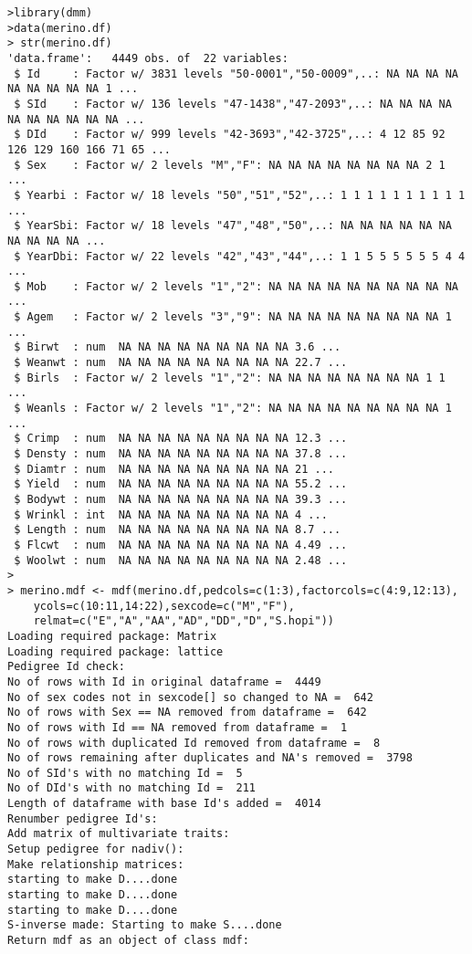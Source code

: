 \documentclass[titlepage]{article}  %
\begin{document}
\begin{verbatim}
>library(dmm)
>data(merino.df)
> str(merino.df)
'data.frame':	4449 obs. of  22 variables:
 $ Id     : Factor w/ 3831 levels "50-0001","50-0009",..: NA NA NA NA NA NA NA NA NA 1 ...
 $ SId    : Factor w/ 136 levels "47-1438","47-2093",..: NA NA NA NA NA NA NA NA NA NA ...
 $ DId    : Factor w/ 999 levels "42-3693","42-3725",..: 4 12 85 92 126 129 160 166 71 65 ...
 $ Sex    : Factor w/ 2 levels "M","F": NA NA NA NA NA NA NA NA 2 1 ...
 $ Yearbi : Factor w/ 18 levels "50","51","52",..: 1 1 1 1 1 1 1 1 1 1 ...
 $ YearSbi: Factor w/ 18 levels "47","48","50",..: NA NA NA NA NA NA NA NA NA NA ...
 $ YearDbi: Factor w/ 22 levels "42","43","44",..: 1 1 5 5 5 5 5 5 4 4 ...
 $ Mob    : Factor w/ 2 levels "1","2": NA NA NA NA NA NA NA NA NA NA ...
 $ Agem   : Factor w/ 2 levels "3","9": NA NA NA NA NA NA NA NA NA 1 ...
 $ Birwt  : num  NA NA NA NA NA NA NA NA NA 3.6 ...
 $ Weanwt : num  NA NA NA NA NA NA NA NA NA 22.7 ...
 $ Birls  : Factor w/ 2 levels "1","2": NA NA NA NA NA NA NA NA 1 1 ...
 $ Weanls : Factor w/ 2 levels "1","2": NA NA NA NA NA NA NA NA NA 1 ...
 $ Crimp  : num  NA NA NA NA NA NA NA NA NA 12.3 ...
 $ Densty : num  NA NA NA NA NA NA NA NA NA 37.8 ...
 $ Diamtr : num  NA NA NA NA NA NA NA NA NA 21 ...
 $ Yield  : num  NA NA NA NA NA NA NA NA NA 55.2 ...
 $ Bodywt : num  NA NA NA NA NA NA NA NA NA 39.3 ...
 $ Wrinkl : int  NA NA NA NA NA NA NA NA NA 4 ...
 $ Length : num  NA NA NA NA NA NA NA NA NA 8.7 ...
 $ Flcwt  : num  NA NA NA NA NA NA NA NA NA 4.49 ...
 $ Woolwt : num  NA NA NA NA NA NA NA NA NA 2.48 ...
> 
> merino.mdf <- mdf(merino.df,pedcols=c(1:3),factorcols=c(4:9,12:13),
    ycols=c(10:11,14:22),sexcode=c("M","F"),
    relmat=c("E","A","AA","AD","DD","D","S.hopi"))
Loading required package: Matrix
Loading required package: lattice
Pedigree Id check:
No of rows with Id in original dataframe =  4449 
No of sex codes not in sexcode[] so changed to NA =  642 
No of rows with Sex == NA removed from dataframe =  642 
No of rows with Id == NA removed from dataframe =  1 
No of rows with duplicated Id removed from dataframe =  8 
No of rows remaining after duplicates and NA's removed =  3798 
No of SId's with no matching Id =  5 
No of DId's with no matching Id =  211 
Length of dataframe with base Id's added =  4014 
Renumber pedigree Id's:
Add matrix of multivariate traits:
Setup pedigree for nadiv():
Make relationship matrices:
starting to make D....done 
starting to make D....done 
starting to make D....done 
S-inverse made: Starting to make S....done 
Return mdf as an object of class mdf:

\end{verbatim}
\end{document}
